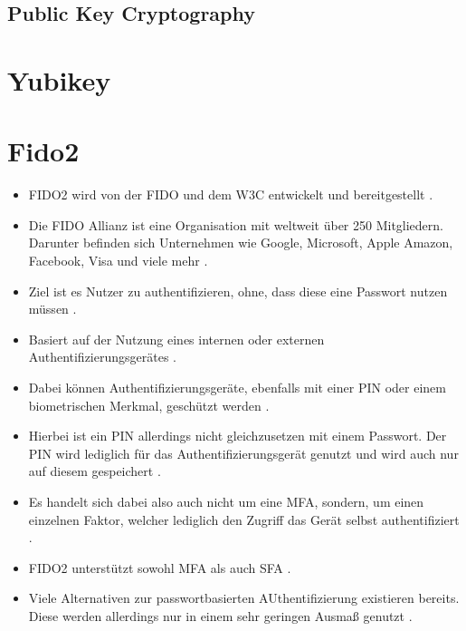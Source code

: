 \subsection{Public Key Cryptography}

\section{Yubikey}

\section{Fido2}

\begin{itemize}
    \item FIDO2 wird von der \ac{FIDO} und dem \ac{W3C} entwickelt und bereitgestellt \cite{lyastani2020fido2} \cite{farke2020you}.
    \item Die \ac{FIDO} Allianz ist eine Organisation mit weltweit über 250 Mitgliedern. Darunter befinden sich Unternehmen wie Google, Microsoft, Apple Amazon, Facebook, Visa und viele mehr \cite{lyastani2020fido2} \cite{farke2020you}.
    \item Ziel ist es Nutzer zu authentifizieren, ohne, dass diese eine Passwort nutzen müssen \cite{morii2017research} \cite{barbosa2021provable}.
    \item Basiert auf der Nutzung eines internen oder externen Authentifizierungsgerätes \cite{morii2017research} \cite{barbosa2021provable}.
    \item Dabei können Authentifizierungsgeräte, ebenfalls mit einer PIN oder einem biometrischen Merkmal, geschützt werden \cite{farke2020you}.
    \item Hierbei ist ein PIN allerdings nicht gleichzusetzen mit einem Passwort. Der PIN wird lediglich für das Authentifizierungsgerät genutzt und wird auch nur auf diesem gespeichert \cite{farke2020you} \cite{barbosa2021provable}.
    \item Es handelt sich dabei also auch nicht um eine \ac{MFA}, sondern, um einen einzelnen Faktor, welcher lediglich den Zugriff das Gerät selbst authentifiziert \cite{barbosa2021provable}.
    \item FIDO2 unterstützt sowohl \ac{MFA} als auch \ac{SFA} \cite{lyastani2020fido2} \cite{farke2020you}.
    \item Viele Alternativen zur passwortbasierten AUthentifizierung existieren bereits. Diese werden allerdings nur in einem sehr geringen Ausmaß genutzt \cite{farke2020you}.

\end{itemize}
